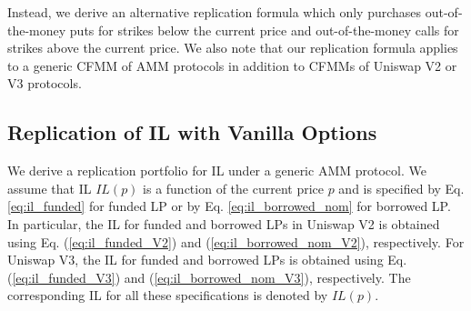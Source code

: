 \documentclass[pdftex,11pt,a4paper] {article}
\begin{document}
Instead, we derive an alternative replication formula which only purchases
out-of-the-money puts for strikes below the current price and out-of-the-money
calls for strikes above the current price. We also note that our
replication formula applies to a generic CFMM of AMM protocols in addition to CFMMs
of Uniswap V2 or V3 protocols.

\subsection{Replication of IL with Vanilla Options}

We derive a replication portfolio for IL under a generic AMM protocol. We
assume that IL $IL(p)$ is a function of the current price $p$ and is specified
by Eq. \eqref{eq:il_funded} for funded LP or by Eq. \eqref{eq:il_borrowed_nom}
for borrowed LP. In particular, the IL for funded and borrowed LPs in
Uniswap V2 is obtained using Eq. (\ref{eq:il_funded_V2}) and (\ref{eq:il_borrowed_nom_V2}), respectively. For Uniswap V3, the IL for funded
and borrowed LPs is obtained using Eq. (\ref{eq:il_funded_V3}) and (\ref{eq:il_borrowed_nom_V3}), respectively. The corresponding IL for all these
specifications is denoted by $IL(p)$.
\end{document}
